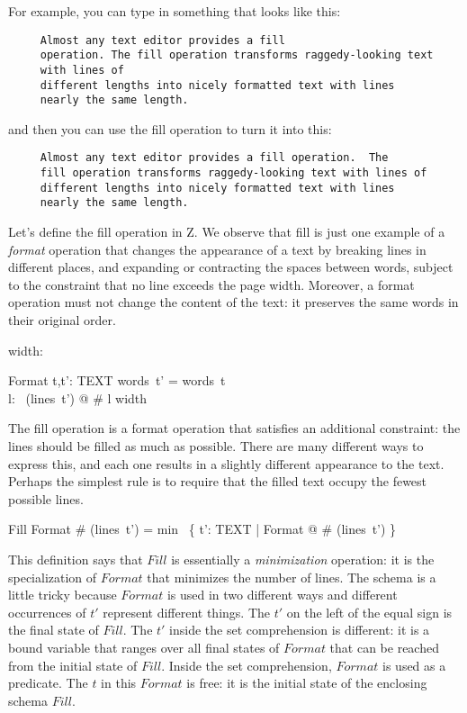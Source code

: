 \documentclass{article}
\begin{document}
For example, you can type in something that looks like this:

\begin{verbatim}
     Almost any text editor provides a fill 
     operation. The fill operation transforms raggedy-looking text 
     with lines of
     different lengths into nicely formatted text with lines
     nearly the same length.
\end{verbatim}

and then you can use the fill operation to turn it into this:

\begin{verbatim}
     Almost any text editor provides a fill operation.  The
     fill operation transforms raggedy-looking text with lines of
     different lengths into nicely formatted text with lines
     nearly the same length.
\end{verbatim}

Let's define the fill operation in Z.  We observe that fill is just one
example of a {\em format} operation that changes the appearance of a text by
breaking lines in different places, and expanding or contracting the spaces
between words, subject to the constraint that no line exceeds the page 
width.  Moreover, a format operation must not change the content of the text:
it preserves the same words in their original order.

\begin{axdef} width: \nat \end{axdef}
\begin{schema}{Format}
	t,t': TEXT
\where
	words~t' = words~t \\
	\forall l: \ran~(lines~t') @ \# l \leq width
\end{schema} 
The fill operation is a format operation that satisfies an additional
constraint: the lines should be filled as much as possible.  There are many
different ways to express this, and each one results in a slightly different
appearance to the text.  Perhaps the simplest rule is to require that the
filled text occupy the fewest possible lines.  

\begin{schema}{Fill}
	Format
\where
	\# (lines~t') = min~ \{ t': TEXT | Format @ \# (lines~t') \}
\end{schema}
This definition says that $Fill$ is essentially a {\em minimization}
operation: it is the specialization of $Format$ that minimizes the
number of lines.  The schema is a little tricky because $Format$ is
used in two different ways and different occurrences of $t'$ represent
different things.  The $t'$ on the left of the equal sign is the final
state of $Fill$.  The $t'$ inside the set comprehension is different:
it is a bound variable that ranges over all final states of $Format$
that can be reached from the initial state of $Fill$.  Inside the set
comprehension, $Format$ is used as a predicate.  The $t$ in this
$Format$ is free: it is the initial state of the enclosing schema
$Fill$.
\end{document}

